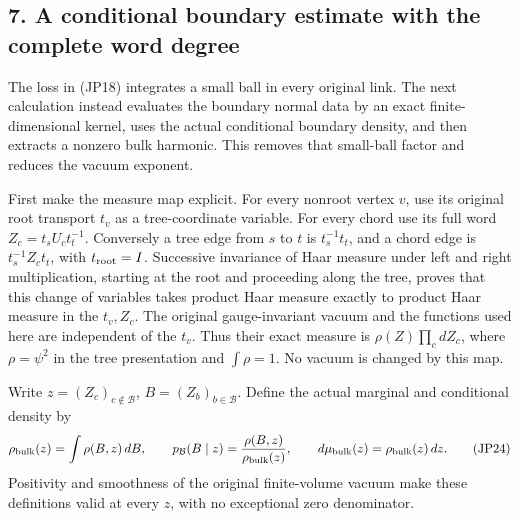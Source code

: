 \documentclass[11pt]{article}
\begin{document}
\subsection*{7. A conditional boundary estimate with the complete word degree}

The loss in (JP18) integrates a small ball in every original link.
The next calculation instead evaluates the boundary normal data by an
exact finite-dimensional kernel, uses the actual conditional boundary
density, and then extracts a nonzero bulk harmonic. This removes that
small-ball factor and reduces the vacuum exponent.

First make the measure map explicit. For every nonroot vertex \(v\),
use its original root transport \(t_v\) as a tree-coordinate variable.
For every chord use its full word \(Z_c=t_sU_ct_t^{-1}\).
Conversely a tree edge from \(s\) to \(t\) is \(t_s^{-1}t_t\),
and a chord edge is \(t_s^{-1}Z_ct_t\), with \(t_{\rm root}=I\).
Successive invariance of Haar measure under left and right multiplication,
starting at the root and proceeding along the tree, proves that this
change of variables takes product Haar measure exactly to product Haar
measure in the \(t_v,Z_c\). The original gauge-invariant vacuum and the
functions used here are independent of the \(t_v\). Thus their exact
measure is \(\rho(Z)\prod_cdZ_c\), where \(\rho=\psi^2\) in the
tree presentation and \(\int\rho=1\). No vacuum is changed by this map.

Write \(z=(Z_c)_{c\notin\mathcal B}\), \(B=(Z_b)_{b\in\mathcal B}\).
Define the actual marginal and conditional density by
\[
 \rho_{\rm bulk}(z)=\int\rho(B,z)\,dB,\qquad
 p_{\mathcal B}(B\mid z)={\rho(B,z)\over\rho_{\rm bulk}(z)},\qquad
 d\mu_{\rm bulk}(z)=\rho_{\rm bulk}(z)\,dz .
 \tag{JP24}
\]
Positivity and smoothness of the original finite-volume vacuum make
these definitions valid at every \(z\), with no exceptional zero
denominator.
\end{document}
